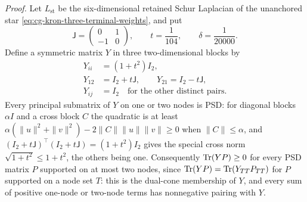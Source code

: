 \noindent\emph{Proof.}
Let \(L_{\mathrm{st}}\) be the six-dimensional retained Schur Laplacian of the
unanchored star \eqref{eq:cg-kron-three-terminal-weights}, and put
\begin{equation}
\mathsf J=\begin{pmatrix}0&1\\-1&0\end{pmatrix},\qquad
t=\frac1{104},\qquad \delta=\frac1{20000}.
\label{eq:cg-kron-rational-separator-constants}
\end{equation}
Define a symmetric matrix \(Y\) in three two-dimensional blocks by
\begin{equation}
\begin{aligned}
Y_{ii}&=(1+t^2)I_2,\\
Y_{12}&=I_2+t\mathsf J,\qquad Y_{21}=I_2-t\mathsf J,\\
Y_{ij}&=I_2\quad\text{for the other distinct pairs}.
\end{aligned}
\label{eq:cg-kron-rational-separator}
\end{equation}
Every principal submatrix of \(Y\) on one or two nodes is PSD: for diagonal
blocks \(\alpha I\) and a cross block \(C\) the quadratic is at least
\(\alpha(\|u\|^2+\|v\|^2)-2\|C\|\|u\|\|v\|\geq0\) when \(\|C\|\leq\alpha\), and
\((I_2+t\mathsf J)^\top(I_2+t\mathsf J)=(1+t^2)I_2\) gives the special cross norm
\(\sqrt{1+t^2}\leq1+t^2\), the others being one. Consequently
\(\operatorname{Tr}(YP)\geq0\) for every PSD matrix \(P\) supported on at most two nodes,
since \(\operatorname{Tr}(YP)=\operatorname{Tr}(Y_{TT}P_{TT})\) for \(P\) supported on a node set \(T\): this
is the dual-cone membership of \(Y\), and every sum of positive one-node or
two-node terms has nonnegative pairing with \(Y\).

